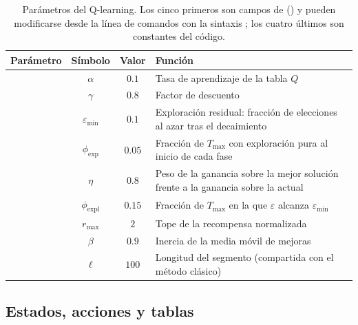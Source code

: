 \begin{table}[H]
\centering
\small
\caption{Parámetros del Q-learning. Los cinco primeros son campos de 
() y pueden modificarse desde la línea de comandos con la sintaxis
; los cuatro últimos son constantes del código.}
\label{tab:params-ql}
\begin{tabularx}{\textwidth}{@{}l c c L@{}}
\toprule
Parámetro & Símbolo & Valor & Función \\
\midrule
{} & $\alpha$ & $0.1$ & Tasa de aprendizaje de la tabla $Q$ \\
 & $\gamma$ & $0.8$ & Factor de descuento \\
 & $\varepsilon_{\min}$ & $0.1$ & Exploración residual: fracción de elecciones al azar tras el decaimiento \\
 & $\phi_{\mathrm{exp}}$ & $0.05$ & Fracción de $T_{\max}$ con exploración pura al inicio de cada fase \\
 & $\eta$ & $0.8$ & Peso de la ganancia sobre la mejor solución frente a la ganancia sobre la actual \\
\midrule
{} & $\phi_{\mathrm{expl}}$ & $0.15$ & Fracción de $T_{\max}$ en la que $\varepsilon$ alcanza $\varepsilon_{\min}$ \\
 & $r_{\max}$ & $2$ & Tope de la recompensa normalizada \\
 & $\beta$ & $0.9$ & Inercia de la media móvil de mejoras \\
 & $\ell$ & $100$ & Longitud del segmento (compartida con el método clásico) \\
\bottomrule
\end{tabularx}
\end{table}

\subsection{Estados, acciones y tablas}
\label{sec:ql-estado}

